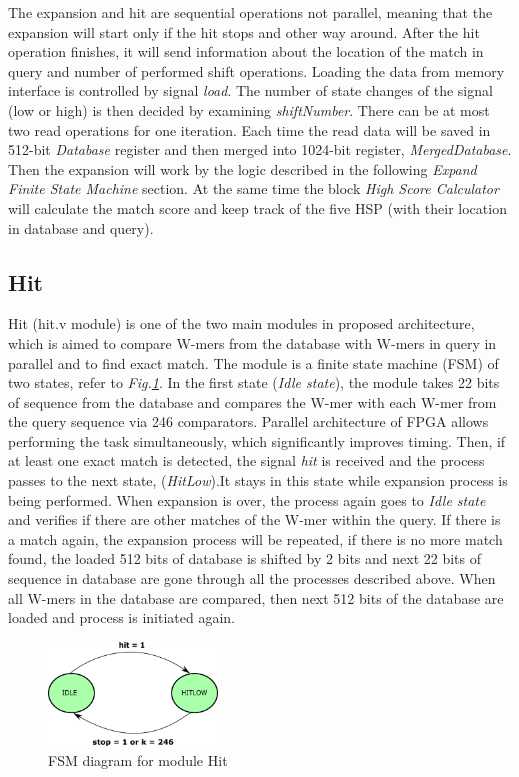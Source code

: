 The expansion and hit are sequential operations not parallel, meaning that the expansion will start only if the hit stops and other way around. After the hit operation finishes, it will send information about the location of the match in query and number of performed shift operations. Loading the data from memory interface is controlled by signal \textit{load}. The number of state changes of the signal (low or high) is then decided by examining \textit{shiftNumber}. There can be at most two read operations for one iteration. Each time the read data will be saved in 512-bit \textit{Database} register and then merged into 1024-bit register, \textit{MergedDatabase}. Then the expansion will work by the logic described in the following \textit{Expand Finite State Machine} section. 
At the same time the block \textit{High Score Calculator} will calculate the match score and keep track of the five HSP (with their location in database and query).    



\subsection{Hit}
\quad Hit (hit.v module) is one of the two main modules in proposed architecture, which is aimed to compare W-mers from the database with W-mers in query in parallel and to find exact match. The module is a finite state machine (FSM) of two states, refer to \textit{Fig.\ref{fig:hitFSM}}. In the first state (\textit{Idle state}), the module takes 22 bits of sequence from the database and compares the W-mer with each W-mer from the query sequence via 246 comparators. Parallel architecture of FPGA allows performing the task simultaneously, which significantly improves timing. Then, if at least one exact match is detected, the signal \textit{hit} is received and the process passes to the next state, (\textit{HitLow}).It stays in this state while expansion process is being performed. When expansion is over, the process again goes to \textit{Idle state} and verifies if there are other matches of the W-mer within the query. If there is a match again, the expansion process will be repeated, if there is no more match found, the loaded 512 bits of database is shifted by 2 bits and next 22 bits of sequence in database are gone through all the processes described above. When all W-mers in the database are compared, then next 512 bits of the database are loaded and process is initiated again. 

\begin{figure}[h!]
\centering
\includegraphics[width=0.4\textwidth]{Figures/hitFSM.pdf}
\caption{FSM diagram for module Hit} \label{fig:hitFSM}
\end{figure}



